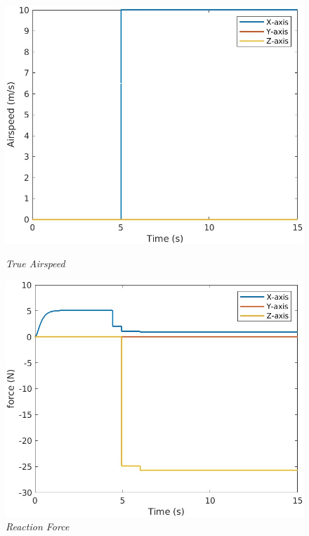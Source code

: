 \begin{figure}[htbp]
  \centering
  \begin{minipage}[b]{0.3\textwidth}
    \centering
    \includegraphics[width=\textwidth]{Images/Gust/FIXED/1 airspeed_1.jpg}
    \caption*{\textit{True Airspeed}}
  \end{minipage}
  \hfil
  \begin{minipage}[b]{0.3\textwidth}
    \centering
    \includegraphics[width=\textwidth]{Images/Gust/FIXED/2 force_1.jpg}
    \caption*{\textit{Reaction Force}}
  \end{minipage}
  \hfil
  \begin{minipage}[b]{0.3\textwidth}

\end{minipage}
\end{figure}
